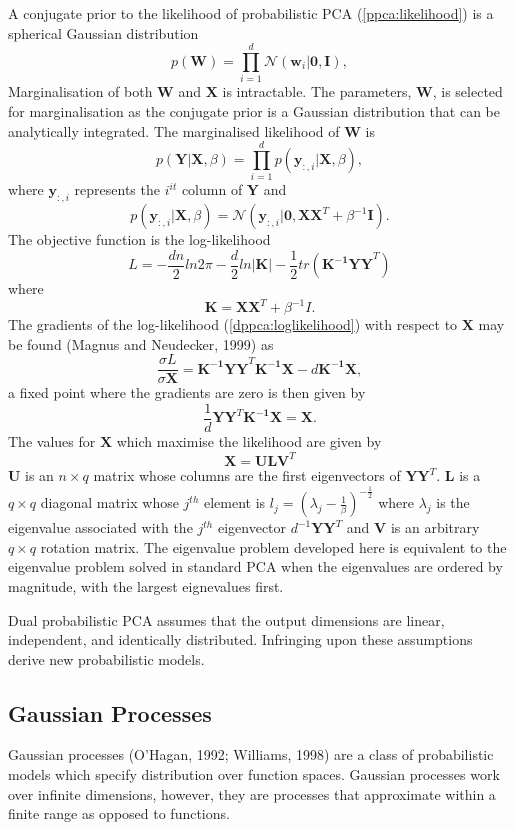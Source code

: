\documentclass[ %
                    author={Dillon Keith Diep [INCOMPLETE DRAFT, NOT FOR SUBMISSION]},
                supervisor={Dr. Carl Henrik Ek},
                    degree={MEng},
                     title={ARt-CG:},
                  subtitle={Assisted Real-time Content Generation of 3D Hair by Learning Manifolds},
                      type={Research},
                      year={2014} ]{dissertation}
\begin{document}
A conjugate prior to the likelihood of probabilistic PCA (\ref{ppca:likelihood}) is a spherical Gaussian distribution
$$p(\mathbf{W})=\prod^d_{i=1}\mathcal{N}(\mathbf{w}_i|\mathbf{0,I}),$$
Marginalisation of both $\mathbf{W}$ and $\mathbf{X}$ is intractable. 
The parameters, $\mathbf{W}$, is selected for marginalisation as the conjugate prior is a Gaussian distribution that can be analytically integrated.
The marginalised likelihood of $\mathbf{W}$ is
$$p(\mathbf{Y|X},\beta)=\prod^d_{i=1}p(\mathbf{y}_{:,i}|\mathbf{X},\beta),$$
where $\mathbf{y}_{:,i}$ represents the $i^{it}$ column of $\mathbf{Y}$ and
$$p(\mathbf{y}_{:,i}|\mathbf{X},\beta)=\mathcal{N}(\mathbf{y}_{:,i}|\mathbf{0,XX}^T+\beta^{-1}\mathbf{I}).$$
The objective function is the log-likelihood
\begin{equation} \label{dppca:loglikelihood}
	L=-\frac{dn}{2}ln2\pi-\frac{d}{2}ln|\mathbf{K}|-\frac{1}{2}tr(\mathbf{K^{-1}YY}^T)
\end{equation}
where $$\mathbf{K=XX}^T+\beta^{-1}I.$$
{\color{red}The gradients of the log-likelihood (\ref{dppca:loglikelihood}) with respect to $\mathbf{X}$ may be found (Magnus and Neudecker, 1999) as}
$$\frac{\sigma L}{\sigma \mathbf{X}}=\mathbf{K^{-1}YY}^T\mathbf{K^{-1}X}-d\mathbf{K^{-1}X},$$
a fixed point where the gradients are zero is then given by 
$$\frac{1}{d}\mathbf{YY}^T\mathbf{K^{-1}X=X}.$$
The values for $\mathbf{X}$ which maximise the likelihood are given by 
$$\mathbf{X=ULV}^T$$
$\mathbf{U}$ is an $n \times q$ matrix whose columns are the first eigenvectors of $\mathbf{YY}^T$. $\mathbf{L}$ is a $q \times q$ diagonal matrix whose $j^{th}$ element is $l_j=(\lambda_j-\frac{1}{\beta})^{-\frac{1}{2}}$ where $\lambda_j$ is the eigenvalue associated with the $j^{th}$ eigenvector $d^{-1}\mathbf{YY}^T$ and $\mathbf{V}$ is an arbitrary $q\times q$ rotation matrix. The eigenvalue problem developed here is equivalent to the eigenvalue problem solved in standard PCA when the eigenvalues are ordered by magnitude, with the largest eignevalues first.

Dual probabilistic PCA assumes that the output dimensions are linear, independent, and identically distributed. Infringing upon these assumptions derive new probabilistic models.

\subsection{Gaussian Processes}
Gaussian processes (O'Hagan, 1992; Williams, 1998) are a class of probabilistic models which specify distribution over function spaces.
Gaussian processes work over infinite dimensions, however, they are processes that approximate within a finite range as opposed to functions.
\end{document}
